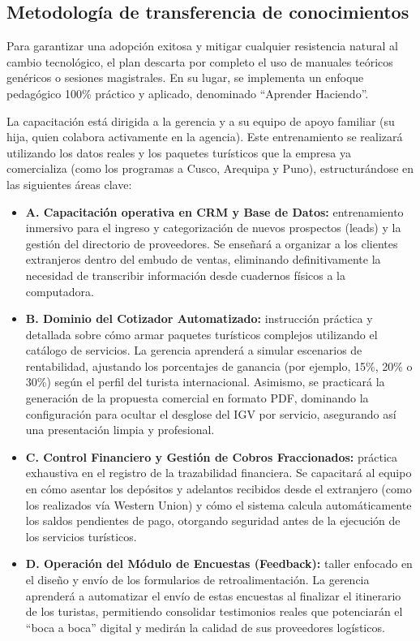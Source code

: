 \subsection{Metodología de transferencia de conocimientos}
\begin{indentedsubsection}
Para garantizar una adopción exitosa y mitigar cualquier resistencia natural al cambio tecnológico, el plan descarta por completo el uso de manuales teóricos genéricos o sesiones magistrales. En su lugar, se implementa un enfoque pedagógico 100\% práctico y aplicado, denominado ``Aprender Haciendo''.

La capacitación está dirigida a la gerencia y a su equipo de apoyo familiar (su hija, quien colabora activamente en la agencia). Este entrenamiento se realizará utilizando los datos reales y los paquetes turísticos que la empresa ya comercializa (como los programas a Cusco, Arequipa y Puno), estructurándose en las siguientes áreas clave:

\begin{itemize}
    \item \textbf{A. Capacitación operativa en CRM y Base de Datos:} entrenamiento inmersivo para el ingreso y categorización de nuevos prospectos (leads) y la gestión del directorio de proveedores. Se enseñará a organizar a los clientes extranjeros dentro del embudo de ventas, eliminando definitivamente la necesidad de transcribir información desde cuadernos físicos a la computadora.
    \item \textbf{B. Dominio del Cotizador Automatizado:} instrucción práctica y detallada sobre cómo armar paquetes turísticos complejos utilizando el catálogo de servicios. La gerencia aprenderá a simular escenarios de rentabilidad, ajustando los porcentajes de ganancia (por ejemplo, 15\%, 20\% o 30\%) según el perfil del turista internacional. Asimismo, se practicará la generación de la propuesta comercial en formato PDF, dominando la configuración para ocultar el desglose del IGV por servicio, asegurando así una presentación limpia y profesional.
    \item \textbf{C. Control Financiero y Gestión de Cobros Fraccionados:} práctica exhaustiva en el registro de la trazabilidad financiera. Se capacitará al equipo en cómo asentar los depósitos y adelantos recibidos desde el extranjero (como los realizados vía Western Union) y cómo el sistema calcula automáticamente los saldos pendientes de pago, otorgando seguridad antes de la ejecución de los servicios turísticos.
    \item \textbf{D. Operación del Módulo de Encuestas (Feedback):} taller enfocado en el diseño y envío de los formularios de retroalimentación. La gerencia aprenderá a automatizar el envío de estas encuestas al finalizar el itinerario de los turistas, permitiendo consolidar testimonios reales que potenciarán el ``boca a boca'' digital y medirán la calidad de sus proveedores logísticos.
\end{itemize}
\end{indentedsubsection}

